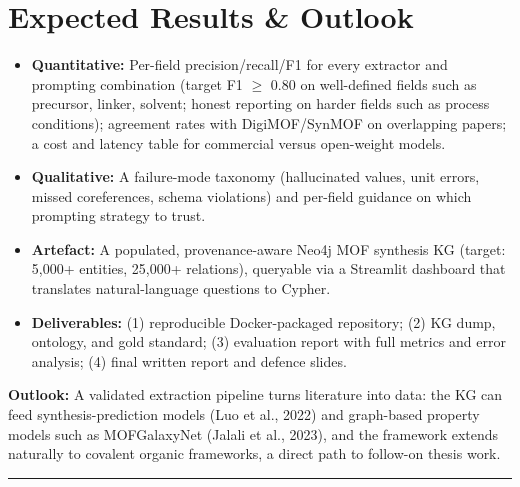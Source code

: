 \documentclass[11pt,a4paper]{article}
\newcommand{\srhrule}{\vspace{0.4ex}\noindent\textcolor{srhorange}{\rule{\linewidth}{0.4pt}}\vspace{0.6ex}}
\begin{document}
\section{Expected Results \& Outlook}
\begin{itemize}
  \item \textbf{Quantitative:} Per-field precision/recall/F1 for every extractor and prompting combination (target F1 $\geq$ 0.80 on well-defined fields such as precursor, linker, solvent; honest reporting on harder fields such as process conditions); agreement rates with DigiMOF/SynMOF on overlapping papers; a cost and latency table for commercial versus open-weight models.
  \item \textbf{Qualitative:} A failure-mode taxonomy (hallucinated values, unit errors, missed coreferences, schema violations) and per-field guidance on which prompting strategy to trust.
  \item \textbf{Artefact:} A populated, provenance-aware Neo4j MOF synthesis KG (target: 5{,}000+ entities, 25{,}000+ relations), queryable via a Streamlit dashboard that translates natural-language questions to Cypher.
  \item \textbf{Deliverables:} (1) reproducible Docker-packaged repository; (2) KG dump, ontology, and gold standard; (3) evaluation report with full metrics and error analysis; (4) final written report and defence slides.
\end{itemize}
\noindent\textbf{Outlook:} A validated extraction pipeline turns literature into data: the KG can feed synthesis-prediction models (Luo et al., 2022) and graph-based property models such as MOFGalaxyNet (Jalali et al., 2023), and the framework extends naturally to covalent organic frameworks, a direct path to follow-on thesis work.
\srhrule

\end{document}
